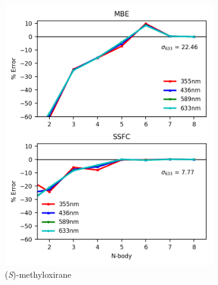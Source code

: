         \begin{figure}
            \begin{subfigure}{0.5\textwidth}
                \centering
                \includegraphics[scale=0.75]{p1/graphs/metox2_7_cam_rot.png}
                \caption{(\textit{S})-methyloxirane}
                \label{metox2_rot_cam}
            \end{subfigure}%
            \begin{subfigure}{0.5\textwidth}
                \centering

\end{subfigure}
\end{figure}
